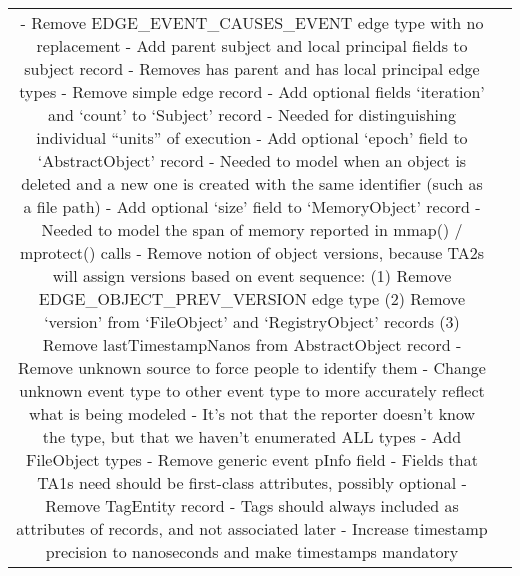 \documentclass[10pt, conference, onecolumn]{IEEEtran}
\newcommand\tab[1][1em]{\hspace*{#1}}
\begin{document}
\begin{longtable}{|c|p{17cm}|}
  - Remove EDGE\_EVENT\_CAUSES\_EVENT edge type with no replacement \newline
  - Add parent subject and local principal fields to subject record \newline
  \tab - Removes has parent and has local principal edge types \newline
  - Remove simple edge record \newline
  - Add optional fields ‘iteration’ and ‘count’ to ‘Subject’ record \newline
  \tab - Needed for distinguishing individual “units” of execution \newline
  - Add optional ‘epoch’ field to ‘AbstractObject’ record \newline
  \tab - Needed to model when an object is deleted and a new one is created with the same identifier (such as a file path) \newline
  - Add optional ‘size’ field to ‘MemoryObject’ record \newline
  \tab - Needed to model the span of memory reported in mmap() / mprotect() calls \newline
  - Remove notion of object versions, because TA2s will assign versions based on event sequence: \newline
  \tab (1) Remove EDGE\_OBJECT\_PREV\_VERSION edge type \newline
  \tab (2) Remove ‘version’ from ‘FileObject’ and ‘RegistryObject’ records \newline
  \tab (3) Remove lastTimestampNanos from AbstractObject record \newline
  - Remove unknown source to force people to identify them \newline
  - Change unknown event type to other event type to more accurately reflect what is being modeled \newline
  \tab - It's not that the reporter doesn't know the type, but that we haven't enumerated ALL types \newline
  - Add FileObject types \newline
  - Remove generic event pInfo field \newline
  \tab - Fields that TA1s need should be first-class attributes, possibly optional \newline
  - Remove TagEntity record \newline
  \tab - Tags should always included as attributes of records, and not associated later \newline
  - Increase timestamp precision to nanoseconds and make timestamps mandatory \newline

\end{longtable}
\end{document}
